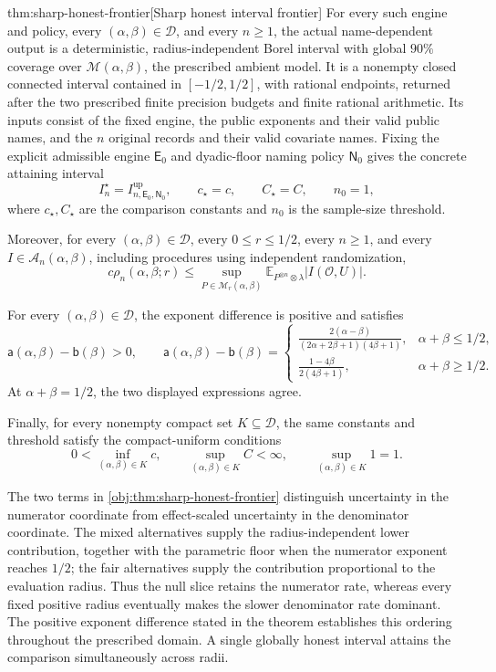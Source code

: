 \documentclass[11pt]{article}
\begin{document}
\begin{theoremv}{thm:sharp-honest-frontier}[Sharp honest interval frontier]
For every such engine and policy, every \((\alpha,\beta)\in\mathcal D\), and every \(n\ge1\), the actual name-dependent output is a deterministic, radius-independent Borel interval with global \(90\%\) coverage over \(\mathcal M(\alpha,\beta)\), the prescribed ambient model. It is a nonempty closed connected interval contained in \([-1/2,1/2]\), with rational endpoints, returned after the two prescribed finite precision budgets and finite rational arithmetic. Its inputs consist of the fixed engine, the public exponents and their valid public names, and the \(n\) original records and their valid covariate names. Fixing the explicit admissible engine \(\mathsf E_0\) and dyadic-floor naming policy \(\mathsf N_0\) gives the concrete attaining interval
\[
I_n^\star
=I^{\mathrm{up}}_{n,\mathsf E_0,\mathsf N_0},
\qquad
c_\star=c,\qquad C_\star=C,\qquad n_0=1,
\]
where \(c_\star,C_\star\) are the comparison constants and \(n_0\) is the sample-size threshold.

Moreover, for every \((\alpha,\beta)\in\mathcal D\), every \(0\le r\le1/2\), every \(n\ge1\), and every \(I\in\mathcal A_n(\alpha,\beta)\), including procedures using independent randomization,
\[
c\rho_n(\alpha,\beta;r)
\le
\sup_{P\in\mathcal M_r(\alpha,\beta)}
\mathbb E_{P^{\otimes n}\otimes\lambda}
\bigl|I(\mathcal O,U)\bigr|.
\]

For every \((\alpha,\beta)\in\mathcal D\), the exponent difference is positive and satisfies
\[
\mathsf a(\alpha,\beta)-\mathsf b(\beta)>0,
\qquad
\mathsf a(\alpha,\beta)-\mathsf b(\beta)
=
\begin{cases}
\displaystyle
\frac{2(\alpha-\beta)}
{(2\alpha+2\beta+1)(4\beta+1)},
&\alpha+\beta\le1/2,\\[6pt]
\displaystyle
\frac{1-4\beta}{2(4\beta+1)},
&\alpha+\beta\ge1/2.
\end{cases}
\]
At \(\alpha+\beta=1/2\), the two displayed expressions agree.

Finally, for every nonempty compact set \(K\subseteq\mathcal D\), the same constants and threshold satisfy the compact-uniform conditions
\[
0<\inf_{(\alpha,\beta)\in K}c,
\qquad
\sup_{(\alpha,\beta)\in K}C<\infty,
\qquad
\sup_{(\alpha,\beta)\in K}1=1.
\]
\end{theoremv}

The two terms in \cref{obj:thm:sharp-honest-frontier} distinguish uncertainty in the numerator coordinate from effect-scaled uncertainty in the denominator coordinate. The mixed alternatives supply the radius-independent lower contribution, together with the parametric floor when the numerator exponent reaches \(1/2\); the fair alternatives supply the contribution proportional to the evaluation radius. Thus the null slice retains the numerator rate, whereas every fixed positive radius eventually makes the slower denominator rate dominant. The positive exponent difference stated in the theorem establishes this ordering throughout the prescribed domain. A single globally honest interval attains the comparison simultaneously across radii.
\end{document}
